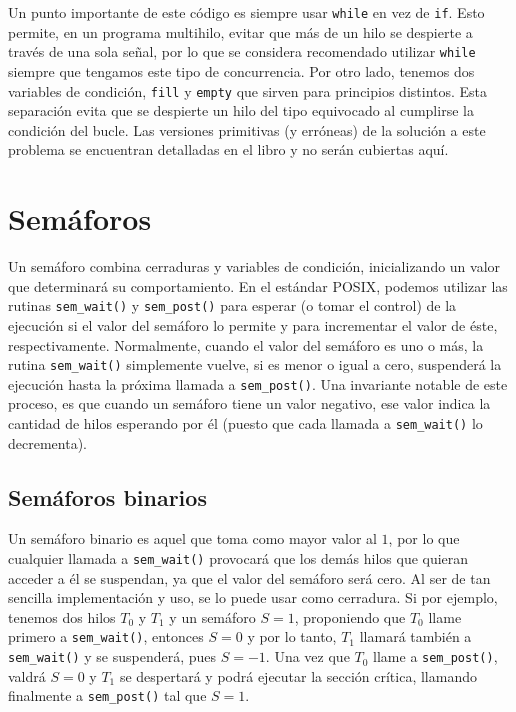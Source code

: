 \documentclass{article}
\begin{document}
	Un punto importante de este código es siempre usar \lstinline|while| en vez de \lstinline|if|. Esto permite, en un programa multihilo, evitar que más de un hilo se despierte a través de una sola señal, por lo que se considera recomendado utilizar \lstinline|while| siempre que tengamos este tipo de concurrencia. Por otro lado, tenemos dos variables de condición, \lstinline|fill| y \lstinline|empty| que sirven para principios distintos. Esta separación evita que se despierte un hilo del tipo equivocado al cumplirse la condición del bucle. Las versiones primitivas (y erróneas) de la solución a este problema se encuentran detalladas en el libro y no serán cubiertas aquí.
	
	\section{Semáforos}
	Un semáforo combina cerraduras y variables de condición, inicializando un valor que determinará su comportamiento. En el estándar POSIX, podemos utilizar las rutinas \lstinline|sem_wait()| y \lstinline|sem_post()| para esperar (o tomar el control) de la ejecución si el valor del semáforo lo permite y para incrementar el valor de éste, respectivamente. Normalmente, cuando el valor del semáforo es uno o más, la rutina \lstinline|sem_wait()| simplemente vuelve, si es menor o igual a cero, suspenderá la ejecución hasta la próxima llamada a \lstinline|sem_post()|. Una invariante notable de este proceso, es que cuando un semáforo tiene un valor negativo, ese valor indica la cantidad de hilos esperando por él (puesto que cada llamada a \lstinline|sem_wait()| lo decrementa).
	
	\subsection{Semáforos binarios}
	Un semáforo binario es aquel que toma como mayor valor al $1$, por lo que cualquier llamada a \lstinline|sem_wait()| provocará que los demás hilos que quieran acceder a él se suspendan, ya que el valor del semáforo será cero. Al ser de tan sencilla implementación y uso, se lo puede usar como cerradura. Si por ejemplo, tenemos dos hilos $T_0$ y $T_1$ y un semáforo $S = 1$, proponiendo que $T_0$ llame primero a \lstinline|sem_wait()|, entonces $S = 0$ y por lo tanto, $T_1$ llamará también a \lstinline|sem_wait()| y se suspenderá, pues $S = -1$. Una vez que $T_0$ llame a \lstinline|sem_post()|, valdrá $S = 0$ y $T_1$ se despertará y podrá ejecutar la sección crítica, llamando finalmente a \lstinline|sem_post()| tal que $S = 1$.
	
\end{document}
